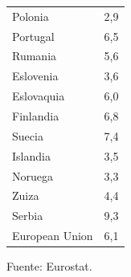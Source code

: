 \begin{enumerate}
\begin{table}[htbp]
{\begin{tabular}{lr}
	   \quad Polonia&2,9\\
	   \quad Portugal&6,5\\
	   \quad Rumania&5,6\\
	   \quad Eslovenia&3,6\\
	   \quad Eslovaquia&6,0\\
	   \quad Finlandia&6,8\\
	   \quad Suecia&7,4\\
	   \quad Islandia&3,5\\
	   \quad Noruega&3,3\\
	   \quad Zuiza&4,4\\
	   \quad Serbia&9,3\\
	   \quad European Union&6,1\\
	\bottomrule
	\end{tabular}%
	}
      \label{tab:addlabel}%
      \begin{center}
      \tiny Fuente: Eurostat.
      \end{center}
    \end{table}


\end{enumerate}
